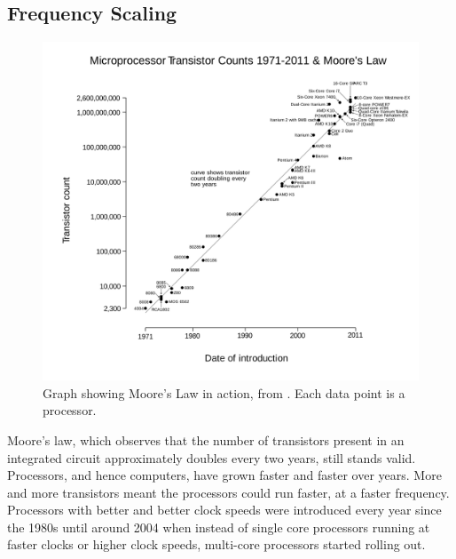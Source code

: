 \documentclass[MTech]{iitmdiss}
\begin{document}
\subsection{Frequency Scaling}
\begin{figure}[h]
    \centering
    \includegraphics[width=\textwidth,scale=0.6,keepaspectratio=true]{mooreslaw.jpg}
    \caption{
        Graph showing Moore's Law in action, from \cite{WikipediaEN:ML}. Each data point is a processor.
    }
    \label{fig:moore's law}
\end{figure}
Moore's law, which observes that the number of transistors present in an integrated circuit approximately doubles every two years, still stands valid. Processors, and hence computers, have grown faster and faster over years. More and more transistors meant the processors could run faster, at a faster frequency. Processors with better and better clock speeds were introduced every year since the 1980s until around 2004 when instead of single core processors running at faster clocks or higher clock speeds, multi-core processors started rolling out.
\end{document}
